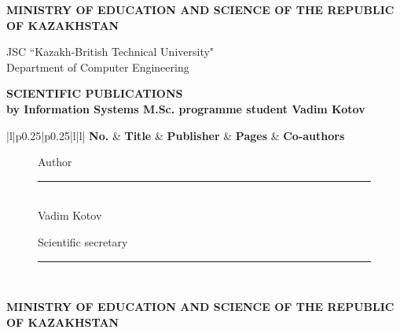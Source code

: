 \begin{titlepage}
	\pagebreak

	\begin{centering}
		{\bf{\MakeUppercase{Ministry of education and science of the republic of Kazakhstan}}

		\vspace{14pt}

		JSC ``Kazakh-British Technical University"\\
		Department of Computer Engineering}


		{\bf
		\MakeUppercase{Scientific publications}\\
		by Information Systems M.Sc. programme student Vadim Kotov
		}

		\vspace{14pt}
	\end{centering}

	\begin{centering}

		\begin{longtable}{|l|p{0.25\textwidth}|p{0.25\textwidth}|l|l|}
			\hline
			\textbf{No.} & \textbf{Title} & \textbf{Publisher} & \textbf{Pages} & \textbf{Co-authors}\\
			\endhead

			\hline

			\end{longtable}
		\end{centering}

		\begin{figure}[ht]
			\begin{minipage}[t]{0.5\linewidth}
				Author\\

				\rule{13em}{0.4pt}\\
				Vadim Kotov\\
			\end{minipage}
			\begin{minipage}[t]{0.5\linewidth}
				Scientific secretary\\

				\rule{13em}{0.4pt}\\
			\end{minipage}
		\end{figure}
		
		\pagebreak

	\begin{centering}
		{\bf{\MakeUppercase{Ministry of education and science of the republic of Kazakhstan}}

		\vspace{14pt}

}
\end{centering}
\end{titlepage}
